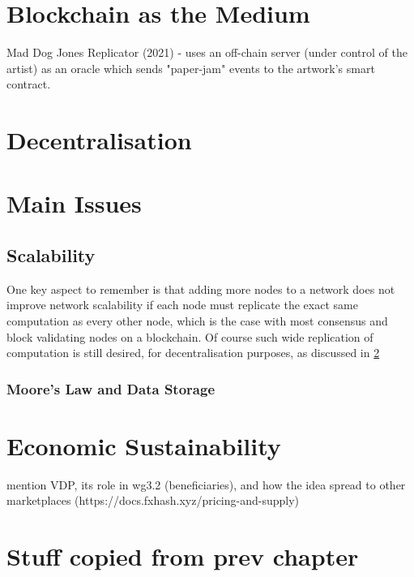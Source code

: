 \section{Blockchain as the Medium}

Mad Dog Jones Replicator (2021) - uses an off-chain server (under control of the artist) as an oracle which sends "paper-jam" events to the artwork's smart contract.

\section{Decentralisation}
\label{sec:lit_review:decentralisation}

\section{Main Issues}

\subsection{Scalability}

One key aspect to remember is that adding more nodes to a network does not improve network scalability if each node must replicate the exact same computation as every other node, which is the case with most consensus and block validating nodes on a blockchain. Of course such wide replication of computation is still desired, for decentralisation purposes, as discussed in \ref{sec:lit_review:decentralisation}


\subsubsection{Moore's Law and Data Storage}

\section{Economic Sustainability}

mention VDP, its role in wg3.2 (beneficiaries), and how the idea spread to other marketplaces (https://docs.fxhash.xyz/pricing-and-supply)




\section{Stuff copied from prev chapter}



